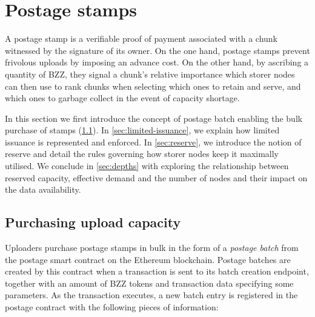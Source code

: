 \section{Postage stamps}\label{sec:postage-stamps}

A postage stamp is a verifiable proof of payment associated with a chunk witnessed by the signature of its owner. On the one hand, postage stamps prevent frivolous uploads by imposing an advance cost. On the other hand, by ascribing a quantity of BZZ, they signal a chunk's relative importance which storer nodes can then use to rank chunks when selecting which ones to retain and serve, and which ones to garbage collect in the event of capacity shortage.

In this section we first introduce the concept of postage batch enabling the bulk purchase of stamps (\ref{sec:purchasing-upload}). In \ref{sec:limited-issuance}, we explain how limited issuance is represented and enforced. In \ref{sec:reserve}, we introduce the notion of reserve and detail the rules governing how storer nodes keep it maximally utilised. We conclude in \ref{sec:depths} with exploring the relationship between reserved capacity, effective demand and the number of nodes and their impact on the data availability.

\subsection{Purchasing upload capacity}\label{sec:purchasing-upload}


Uploaders purchase postage stamps in bulk in the form of a \emph{postage batch} from the postage smart contract on the Ethereum blockchain. Postage batches are created by this contract when a transaction is sent to its batch creation endpoint, together with an amount of BZZ tokens and transaction data specifying some parameters. As the transaction executes, a new batch entry is registered in the postage contract with the following pieces of information:

